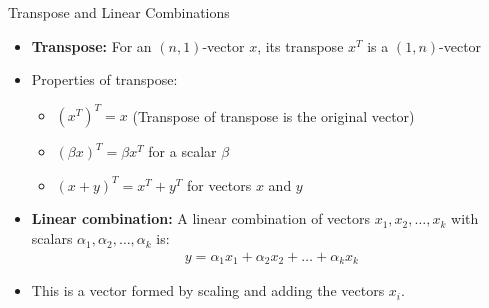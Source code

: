 \begin{frame}{Transpose and Linear Combinations}
\begin{itemize}
    \item \textbf{Transpose:} For an $(n,1)$-vector $x$, its transpose $x^T$ is a $(1,n)$-vector
    \item Properties of transpose:
    \begin{itemize}
        \item $(x^T)^T = x$  (Transpose of transpose is the original vector)
        \item $(\beta x)^T = \beta x^T$ for a scalar $\beta$
        \item $(x + y)^T = x^T + y^T$ for vectors $x$ and $y$
    \end{itemize}
    \item \textbf{Linear combination:} A linear combination of vectors $x_1, x_2, \ldots, x_k$ with scalars $\alpha_1, \alpha_2, \ldots, \alpha_k$ is:
     \begin{align*}
        y = \alpha_1 x_1 + \alpha_2 x_2 + \ldots + \alpha_k x_k
    \end{align*}
    \item This is a vector formed by scaling and adding the vectors $x_i$.
    
\end{itemize}
\end{frame}

